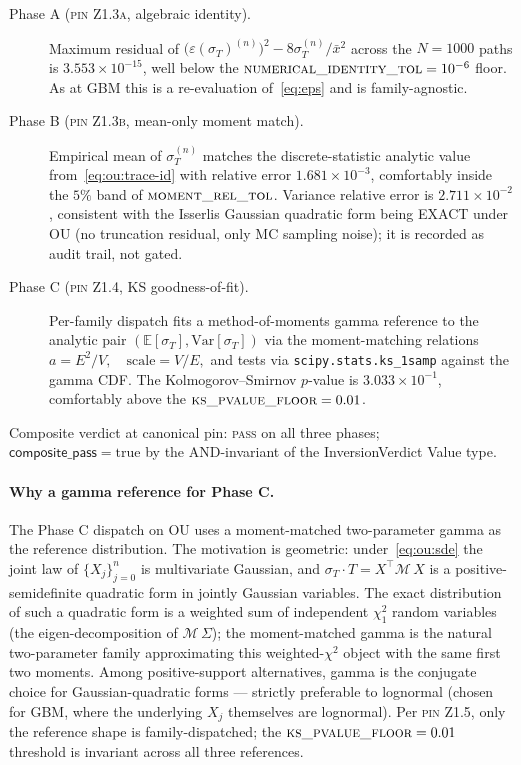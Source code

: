 \documentclass[11pt,letterpaper]{article}
\newcommand{\E}{\mathbb{E}}
\newcommand{\Var}{\text{Var}}
\newcommand{\sigmaT}{\sigma_{T}}
\newcommand{\epsT}{\varepsilon(\sigmaT)}
\newcommand{\xbar}{\bar{x}}
\newcommand{\centerProj}{\mathcal{M}}
\newcommand{\PinZ}[1]{\textsc{pin Z1.#1}}
\begin{document}
\begin{description}
    \item[Phase A (\PinZ{3a}, algebraic identity).]
        Maximum residual of
        $\bigl(\epsT^{(n)}\bigr)^{2} - 8\sigmaT^{(n)}/\xbar^{2}$
        across the $N = 1000$ paths is $3.553\times 10^{-15}$,
        well below the $\textsc{numerical\_identity\_tol} = 10^{-6}$
        floor. As at GBM this is a re-evaluation of~\eqref{eq:eps} and is
        family-agnostic.
    \item[Phase B (\PinZ{3b}, mean-only moment match).]
        Empirical mean of $\sigmaT^{(n)}$ matches the discrete-statistic
        analytic value from~\eqref{eq:ou:trace-id} with relative error
        $1.681\times 10^{-3}$, comfortably inside the $5\%$ band of
        $\textsc{moment\_rel\_tol}$. Variance relative error is
        $2.711\times 10^{-2}$, consistent with the Isserlis Gaussian
        quadratic form being EXACT under OU (no truncation residual,
        only MC sampling noise); it is recorded as audit trail, not
        gated.
    \item[Phase C (\PinZ{4}, KS goodness-of-fit).]
        Per-family dispatch fits a method-of-moments gamma reference
        to the analytic pair $(\E[\sigmaT], \Var[\sigmaT])$ via the
        moment-matching relations
        \(
            a = E^{2}/V,\quad \mathrm{scale} = V/E,
        \)
        and tests via \texttt{scipy.stats.ks\_1samp} against the
        gamma CDF. The Kolmogorov--Smirnov $p$-value is
        $3.033\times 10^{-1}$, comfortably above the
        $\textsc{ks\_pvalue\_floor} = 0.01$.
\end{description}

Composite verdict at canonical pin: \textsc{pass} on all three phases;
$\textsf{composite\_pass} = \mathrm{true}$ by the AND-invariant of the
\textsf{InversionVerdict} Value type.

\paragraph{Why a gamma reference for Phase C.}
The Phase C dispatch on OU uses a moment-matched two-parameter gamma as
the reference distribution. The motivation is geometric: under~\eqref{eq:ou:sde}
the joint law of $\{X_{j}\}_{j=0}^{n}$ is multivariate Gaussian, and
$\sigmaT \cdot T = X^{\top}\centerProj\,X$ is a positive-semidefinite
quadratic form in jointly Gaussian variables. The exact distribution of
such a quadratic form is a weighted sum of independent
$\chi^{2}_{1}$ random variables (the eigen-decomposition of $\centerProj\,\Sigma$);
the moment-matched gamma is the natural two-parameter family approximating
this weighted-$\chi^{2}$ object with the same first two moments. Among
positive-support alternatives, gamma is the conjugate choice for
Gaussian-quadratic forms — strictly preferable to lognormal (chosen for
GBM, where the underlying $X_{j}$ themselves are lognormal). Per
\PinZ{5}, only the reference shape is family-dispatched; the
$\textsc{ks\_pvalue\_floor} = 0.01$ threshold is invariant across all
three references.
\end{document}
